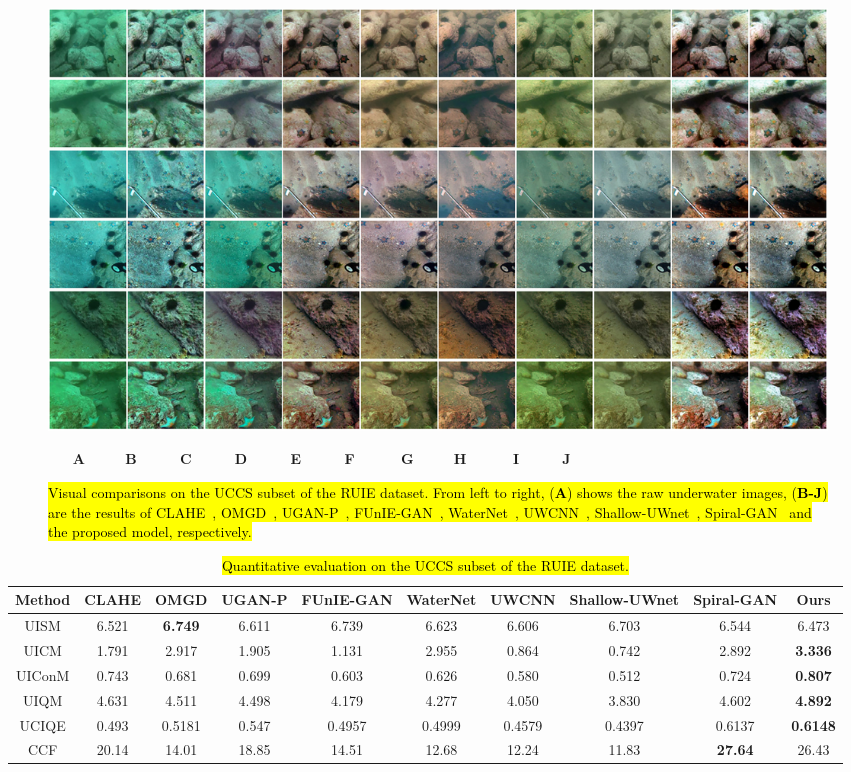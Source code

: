 \documentclass[utf8]{FrontiersinHarvard} %
\begin{document}
\begin{figure}[htbp]
\begin{center}
\includegraphics[width=1\textwidth]{FSpiralGAN_frontiers/onepicture/UCCS300.jpg}
\end{center}
$~~~~~~~~$\textbf{A}$~~~~~~~~~~~~~$\textbf{B}$~~~~~~~~~~~~~~$\textbf{C}$~~~~~~~~~~~~~~$\textbf{D}$~~~~~~~~~~~~~~$\textbf{E}$~~~~~~~~~~~~~~$\textbf{F}$~~~~~~~~~~~~~~~$\textbf{G}$~~~~~~~~~~~~~$\textbf{H}$~~~~~~~~~~~~~~~$\textbf{I}$~~~~~~~~~~~~~~$\textbf{J}
 \caption{\hl{Visual comparisons on the UCCS subset of the RUIE dataset. From left to right, (\textbf{A}) shows the raw underwater images, (\textbf{B-J}) are the results of CLAHE~\citep{109340}, OMGD~\citep{ren2021online}, UGAN-P~\citep{8460552}, FUnIE-GAN~\citep{9001231}, WaterNet~\citep{8917818}, UWCNN~\citep{2019Underwater1}, Shallow-UWnet~\citep{naik2021shallow}, Spiral-GAN~\citep{2020Underwater} and the proposed model, respectively.}\label{fig:comparison-3part}}
\end{figure}

\begin{table}[htbp]\small
\centering
\setlength\tabcolsep{3pt}
\caption{\hl{Quantitative evaluation on the UCCS subset of the RUIE dataset.}}
\begin{tabular}{c|ccccccccc}
\hline  
Method&CLAHE&OMGD&UGAN-P&FUnIE-GAN&WaterNet&UWCNN&Shallow-UWnet&Spiral-GAN&Ours\\
\hline 
UISM&6.521&\textbf{6.749}&6.611&6.739&6.623&6.606&6.703&6.544&6.473\\
\hline 
UICM&1.791&2.917&1.905&1.131&2.955&0.864&0.742&2.892&\textbf{3.336}\\
\hline 
UIConM&0.743&0.681&0.699&0.603&0.626&0.580&0.512&0.724&\textbf{0.807}\\
\hline 
UIQM&4.631&4.511&4.498&4.179&4.277&4.050&3.830&4.602&\textbf{4.892}\\
\hline 
UCIQE&0.493&0.5181&0.547&0.4957&0.4999&0.4579&0.4397&0.6137&\textbf{0.6148}\\
\hline
CCF&20.14&14.01&18.85&14.51&12.68&12.24&11.83&\textbf{27.64}&26.43\\
\hline
\end{tabular}
\label{tbl:comparison-3part}
\end{table}
\end{document}
